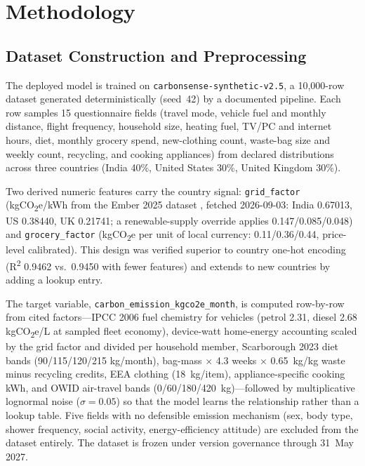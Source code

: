 \documentclass[conference]{IEEEtran}
\begin{document}
\FloatBarrier

\section{Methodology}

\subsection{Dataset Construction and Preprocessing}

The deployed model is trained on \texttt{carbonsense-synthetic-v2.5}, a 10,000-row dataset generated deterministically (seed~42) by a documented pipeline. Each row samples 15 questionnaire fields (travel mode, vehicle fuel and monthly distance, flight frequency, household size, heating fuel, TV/PC and internet hours, diet, monthly grocery spend, new-clothing count, waste-bag size and weekly count, recycling, and cooking appliances) from declared distributions across three countries (India 40\%, United States 30\%, United Kingdom 30\%).

Two derived numeric features carry the country signal: \texttt{grid\_factor} (kgCO\textsubscript{2}e/kWh from the Ember 2025 dataset \cite{ember2025}, fetched 2026-09-03: India 0.67013, US 0.38440, UK 0.21741; a renewable-supply override applies 0.147/0.085/0.048) and \texttt{grocery\_factor} (kgCO\textsubscript{2}e per unit of local currency: 0.11/0.36/0.44, price-level calibrated). This design was verified superior to country one-hot encoding (R\textsuperscript{2} 0.9462 vs.\ 0.9450 with fewer features) and extends to new countries by adding a lookup entry.

The target variable, \texttt{carbon\_emission\_kgco2e\_month}, is computed row-by-row from cited factors---IPCC 2006 \cite{ipcc2006} fuel chemistry for vehicles (petrol 2.31, diesel 2.68 kgCO\textsubscript{2}e/L at sampled fleet economy), device-watt home-energy accounting scaled by the grid factor and divided per household member, Scarborough 2023 \cite{scarborough2023} diet bands (90/115/120/215 kg/month), bag-mass $\times$ 4.3 weeks $\times$ 0.65~kg/kg waste minus recycling credits, EEA clothing (18~kg/item), appliance-specific cooking kWh, and OWID air-travel bands (0/60/180/420~kg)---followed by multiplicative lognormal noise ($\sigma = 0.05$) so that the model learns the relationship rather than a lookup table. Five fields with no defensible emission mechanism (sex, body type, shower frequency, social activity, energy-efficiency attitude) are excluded from the dataset entirely. The dataset is frozen under version governance through 31~May 2027.
\end{document}
